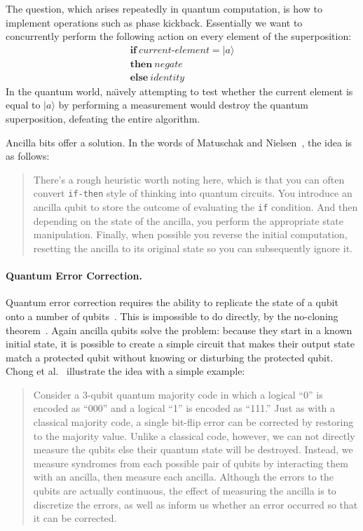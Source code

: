 \documentclass[sigplan,10pt,review,anonymous]{acmart}
\newcommand{\ket}[1]{|#1\rangle}
\begin{document}
The question, which arises repeatedly in quantum computation, is how
to implement operations such as phase kickback. Essentially we want to
concurrently perform the following action on every element of the
superposition:
\[\begin{array}{l}
  \textbf{if}~\textit{current-element}=\ket{a} \\
  \textbf{then}~\textit{negate} \\
  \textbf{else}~\textit{identity}
\end{array}\]
In the quantum world, na\"\i vely attempting to test whether the
current element is equal to $\ket{a}$ by performing a measurement would
destroy the quantum superposition, defeating the entire algorithm.

Ancilla bits offer a solution.  In the words of
Matuschak and Nielsen~\cite{howgrover}, the idea is as follows:
\begin{quote}
  There's a rough heuristic worth noting here, which is that you can
  often convert \verb|if-then| style of thinking into quantum
  circuits. You introduce an ancilla qubit to store the outcome of
  evaluating the \verb|if| condition. And then depending on the state
  of the ancilla, you perform the appropriate state
  manipulation. Finally, when possible you reverse the initial
  computation, resetting the ancilla to its original state so you can
  subsequently ignore it.
\end{quote}

\paragraph*{Quantum Error Correction.}
Quantum error correction requires the ability to replicate the state of a
qubit onto a number of qubits~\cite[Ch.~3]{NAP25196}. This is impossible to do
directly, by the no-cloning
theorem~\cite{park1970concept,wootters1982single,dieks1982communication}. Again
ancilla qubits solve the problem: because they start in a known
initial state, it is possible to create a simple circuit that makes
their output state match a protected qubit without knowing or
disturbing the protected qubit. Chong et al.~\cite{sigarchblog}
illustrate the idea with a simple example:
\begin{quote}
Consider a 3-qubit quantum majority code in which a logical ``0'' is
encoded as ``000'' and a logical ``1'' is encoded as ``111.''  Just as with
a classical majority code, a single bit-flip error can be corrected by
restoring to the majority value.  Unlike a classical code, however, we
can not directly measure the qubits else their quantum state will be
destroyed.  Instead, we measure syndromes from each possible pair of
qubits by interacting them with an ancilla, then measure each ancilla.
Although the errors to the qubits are actually continuous, the effect
of measuring the ancilla is to discretize the errors, as well as
inform us whether an error occurred so that it can be corrected.
\end{quote}
\end{document}
